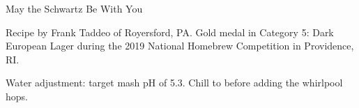 \stylesection{\styleschwarzbier}

\begin{recipe}{May the Schwartz Be With You} %

\begin{aboutblock}
Recipe by Frank Taddeo of Royersford, PA. Gold medal in Category 5: Dark European
Lager during the 2019 National Homebrew Competition in Providence, RI. \sourceaha
\end{aboutblock}


\begin{methodandtiming}
 
\begin{mashsteps}
\end{mashsteps}

\begin{fermentationsteps}
\end{fermentationsteps}

\begin{directions}
Water adjustment: target mash pH of 5.3. Chill to  before adding the
whirlpool hops.
\end{directions}

\end{methodandtiming}

\recipebreak

\begin{ingredientsblock}

\begin{malts}
\end{malts}

\begin{hops}
\end{hops}


\end{ingredientsblock}

\end{recipe}

